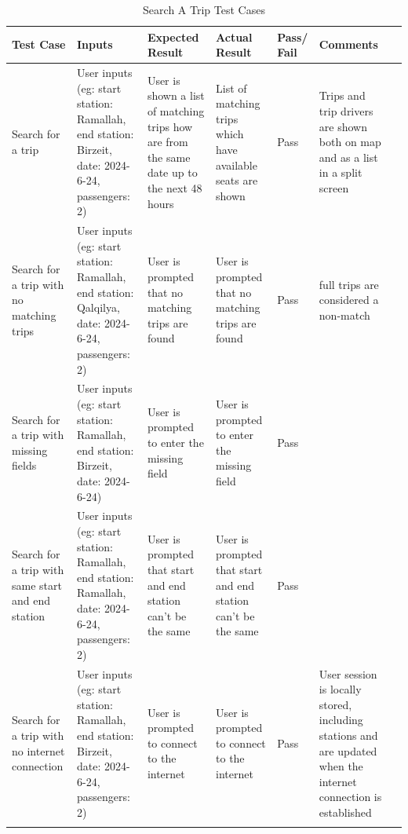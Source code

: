 \documentclass[a4paper, 12pt]{report} %
\begin{document}
                \begin{spacing}{1}               
                    \begin{longtable}{| R{2cm}|R{3cm}|R{2cm}|R{2cm}|R{2cm}|R{2cm}|R{2cm}|}
                         \textbf{Test Case} & \textbf{Inputs} & \textbf{Expected Result} & \textbf{Actual Result} & \textbf{Pass/ Fail} & \textbf{Comments} \\
                        
                        \endfirsthead
                        \endhead
                
                        \endfoot
                        \endlastfoot
                        \hline
                        Search for a trip & User inputs (eg: start station: Ramallah, end station: Birzeit, date: 2024-6-24, passengers: 2) & User is shown a list of matching trips how are from the same date up to the next 48 hours & List of matching trips which have available seats are shown & Pass & Trips and trip drivers are shown both on map and as a list in a split screen\\
                        \hline
                        Search for a trip with no matching trips & User inputs (eg: start station: Ramallah, end station: Qalqilya, date: 2024-6-24, passengers: 2) & User is prompted that no matching trips are found & User is prompted that no matching trips are found & Pass & full trips are considered a non-match\\
                        \hline
                        Search for a trip with missing fields & User inputs (eg: start station: Ramallah, end station: Birzeit, date: 2024-6-24) & User is prompted to enter the missing field & User is prompted to enter the missing field & Pass & \\
                        \hline
                        Search for a trip with same start and end station & User inputs (eg: start station: Ramallah, end station: Ramallah, date: 2024-6-24, passengers: 2) & User is prompted that start and end station can't be the same & User is prompted that start and end station can't be the same & Pass & \\
                        \hline
                        Search for a trip with no internet connection & User inputs (eg: start station: Ramallah, end station: Birzeit, date: 2024-6-24, passengers: 2) & User is prompted to connect to the internet & User is prompted to connect to the internet & Pass & User session is locally stored, including stations and are updated when the internet connection is established\\
                        \hline
                        \caption{Search A Trip Test Cases \label{tab:search_trip_test}}\\

                    \end{longtable}
                \end{spacing}
\end{document}
